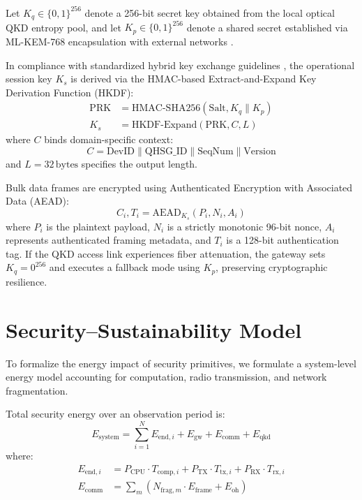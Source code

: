 \documentclass[journal]{IEEEtran}
\begin{document}
Let $K_q \in \{0,1\}^{256}$ denote a 256-bit secret key obtained from the local optical
QKD entropy pool, and let $K_p \in \{0,1\}^{256}$ denote a shared secret established
via ML-KEM-768 encapsulation with external networks \cite{nist203}.

In compliance with standardized hybrid key exchange guidelines \cite{rfc5869,ietfhybrid},
the operational session key $K_s$ is derived via the HMAC-based Extract-and-Expand Key
Derivation Function (HKDF):
\begin{align}
\mathrm{PRK} &= \mathrm{HMAC\text{-}SHA256}(\mathrm{Salt}, K_q \parallel K_p) \label{eq:hkdf_extract} \\
K_s &= \mathrm{HKDF\text{-}Expand}(\mathrm{PRK}, C, L) \label{eq:sessionkey}
\end{align}
where $C$ binds domain-specific context:
\begin{equation}
C = \mathrm{DevID} \parallel \mathrm{QHSG\_ID} \parallel \mathrm{SeqNum} \parallel \mathrm{Version}
\label{eq:context}
\end{equation}
and $L=32\,\text{bytes}$ specifies the output length.

Bulk data frames are encrypted using Authenticated Encryption with Associated Data (AEAD):
\begin{equation}
C_i, T_i = \mathrm{AEAD}_{K_s}(P_i, N_i, A_i)
\label{eq:aead}
\end{equation}
where $P_i$ is the plaintext payload, $N_i$ is a strictly monotonic 96-bit nonce, $A_i$
represents authenticated framing metadata, and $T_i$ is a 128-bit authentication tag.
If the QKD access link experiences fiber attenuation, the gateway sets $K_q = 0^{256}$
and executes a fallback mode using $K_p$, preserving cryptographic resilience.


\section{Security--Sustainability Model}
\label{sec:sustainability_model}

To formalize the energy impact of security primitives, we formulate a system-level
energy model accounting for computation, radio transmission, and network fragmentation.

Total security energy over an observation period is:
\begin{equation}
E_{\mathrm{system}} = \sum_{i=1}^{N} E_{\mathrm{end},i} + E_{\mathrm{gw}} + E_{\mathrm{comm}} + E_{\mathrm{qkd}}
\label{eq:energy}
\end{equation}
where:
\begin{align}
E_{\mathrm{end},i} &= P_{\mathrm{CPU}} \cdot T_{\mathrm{comp},i} + P_{\mathrm{TX}} \cdot T_{\mathrm{tx},i} + P_{\mathrm{RX}} \cdot T_{\mathrm{rx},i} \\
E_{\mathrm{comm}} &= \sum_{m} \left( N_{\mathrm{frag},m} \cdot E_{\mathrm{frame}} + E_{\mathrm{oh}} \right)
\end{align}
\end{document}
